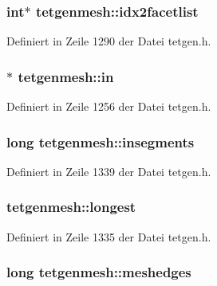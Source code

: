 \hypertarget{classtetgenmesh_a75a402b43e633616f8cb7bc24e472cd8}{
\subsubsection[{idx2facetlist}]{\setlength{\rightskip}{0pt plus 5cm}int$\ast$ tetgenmesh\-::idx2facetlist}}\label{classtetgenmesh_a75a402b43e633616f8cb7bc24e472cd8}


Definiert in Zeile 1290 der Datei tetgen.\-h.

\hypertarget{classtetgenmesh_ad1c82326f58ac7fa521a5fb8bb7ed337}{
\subsubsection[{in}]{$\ast$ tetgenmesh\-::in}}\label{classtetgenmesh_ad1c82326f58ac7fa521a5fb8bb7ed337}


Definiert in Zeile 1256 der Datei tetgen.\-h.

\hypertarget{classtetgenmesh_ac8db017efd7580061843ad9de059194e}{
\subsubsection[{insegments}]{\setlength{\rightskip}{0pt plus 5cm}long tetgenmesh\-::insegments}}\label{classtetgenmesh_ac8db017efd7580061843ad9de059194e}


Definiert in Zeile 1339 der Datei tetgen.\-h.

\hypertarget{classtetgenmesh_af74416d37dea90827a96b28d144177bf}{
\subsubsection[{longest}]{ tetgenmesh\-::longest}}\label{classtetgenmesh_af74416d37dea90827a96b28d144177bf}


Definiert in Zeile 1335 der Datei tetgen.\-h.

\hypertarget{classtetgenmesh_a1ee0dc17e072db0067182d778f53a288}{
\subsubsection[{meshedges}]{\setlength{\rightskip}{0pt plus 5cm}long tetgenmesh\-::meshedges}}\label{classtetgenmesh_a1ee0dc17e072db0067182d778f53a288}


